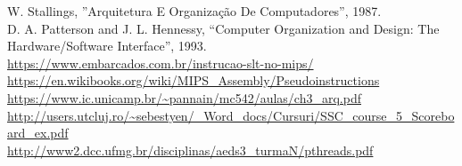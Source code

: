 \documentclass[journal]{IEEEtran}
\begin{document}
\begin{thebibliography}{1}
W. Stallings, ”Arquitetura E Organização De Computadores”, 1987.\\

D. A. Patterson  and J. L. Hennessy, “Computer Organization and Design: The Hardware/Software Interface”, 1993.\\

\url{https://www.embarcados.com.br/instrucao-slt-no-mips/}\\

\url{https://en.wikibooks.org/wiki/MIPS_Assembly/Pseudoinstructions}\\

 \url{https://www.ic.unicamp.br/~pannain/mc542/aulas/ch3_arq.pdf}\\

\url{http://users.utcluj.ro/~sebestyen/_Word_docs/Cursuri/SSC_course_5_Scoreboard_ex.pdf}\\

\url{http://www2.dcc.ufmg.br/disciplinas/aeds3_turmaN/pthreads.pdf}\\

\end{thebibliography}
\end{document}
